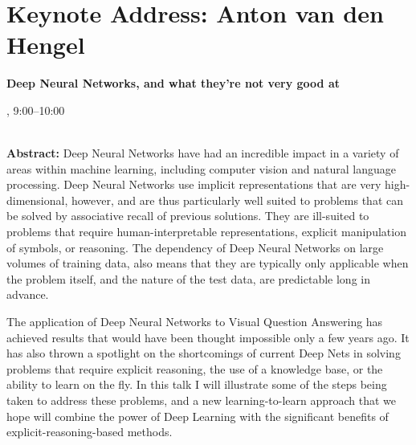 \section{Keynote Address: Anton van den Hengel}

\begin{center}
\begin{Large}
  {\bfseries\Large Deep Neural Networks, and what they’re not very good at} \vspace{1em}\par
\end{Large}


\daydateyear, 9:00--10:00 \vspace{1em}\\
\PlenaryLoc \\
\vspace{1em}\par
\end{center}

\noindent

{\bf Abstract:} Deep Neural Networks have had an incredible impact in a variety of areas within machine learning, including computer vision and natural language processing. Deep Neural Networks use implicit representations that are very high-dimensional, however, and are thus particularly well suited to problems that can be solved by associative recall of previous solutions. They are ill-suited to problems that require human-interpretable representations, explicit manipulation of symbols, or reasoning. The dependency of Deep Neural Networks on large volumes of training data, also means that they are typically only applicable when the problem itself, and the nature of the test data, are predictable long in advance.

The application of Deep Neural Networks to Visual Question Answering has achieved results that would have been thought impossible only a few years ago. It has also thrown a spotlight on the shortcomings of current Deep Nets in solving problems that require explicit reasoning, the use of a knowledge base, or the ability to learn on the fly. In this talk I will illustrate some of the steps being taken to address these problems, and a new learning-to-learn approach that we hope will combine the power of Deep Learning with the significant benefits of explicit-reasoning-based methods.


